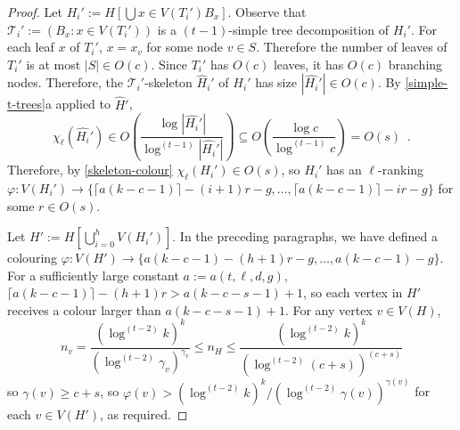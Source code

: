 \documentclass[kpfonts]{patmorin}
\newcommand{\lrn}{\chi_{\ell}}
\theoremstyle{named}
\newcommand{\weirdref}[2]{\cref{#1}#2}
\begin{document}
\begin{proof}
    Let $H_i':=H[\bigcup x\in V(T_i') B_x]$.  Observe that $\mathcal{T}_i':=(B_x:x\in V(T_i'))$ is a $(t-1)$-simple tree decomposition of $H_i'$.  For each leaf $x$ of $T_i'$, $x=x_v$ for some node $v\in S$.  Therefore the number of leaves of $T_i'$ is at most $|S|\in O(c)$. Since $T_i'$ has $O(c)$ leaves, it has $O(c)$ branching nodes.  Therefore, the $\mathcal{T}_i'$-skeleton $\hat{H}_i'$ of $H_i'$ has size $|\hat{H_i}'|\in O(c)$.
    By \weirdref{simple-t-trees}{a} applied to $\hat{H}'$,
    \[
       \lrn(\hat{H_i}')\in
       O\left(\frac{\log|\hat{H_i}'|}{\log^{(t-1)}|\hat{H_i}'|}\right)
       \subseteq O\left(\frac{\log c}{\log^{(t-1)} c}\right) = O(s) \enspace .
    \]
    Therefore, by \cref{skeleton-colour} $\lrn(H_i')\in O(s)$, so
    $H_i'$ has an $\ell$-ranking $\varphi:V(H_i')\to \{\lceil a(k-c-1)\rceil-(i+1)r-g,\ldots,\lceil a(k-c-1)\rceil-ir-g\}$ for some $r\in O(s)$.



    Let $H':=H[\bigcup_{i=0}^h V(H_i')]$. In the preceding paragraphs, we have defined a colouring $\varphi: V(H')\to \{a(k-c-1)-(h+1)r-g,\ldots,a(k-c-1)-g\}$.
    For a sufficiently large constant $a:=a(t,\ell,d,g)$, $\lceil a(k-c-1)\rceil-(h+1)r >  a(k-c-s-1)+1$, so each vertex in $H'$ receives a colour larger than $a(k-c-s-1)+1$.  For any vertex $v\in V(H)$,
    \[ n_v=\frac{(\log^{(t-2)} k)^k}{(\log^{(t-2)}\gamma_v)^{\gamma_v}}
         \le n_H
         \le \frac{(\log^{(t-2)} k)^k}{(\log^{(t-2)}(c+s))^{(c+s)}}
    \]
    so $\gamma(v)\ge c+s$, so $\varphi(v)> (\log^{(t-2)} k)^k/(\log^{(t-2)}\gamma(v))^{\gamma(v)}$ for each $v\in V(H')$, as required.


\end{proof}
\end{document}
